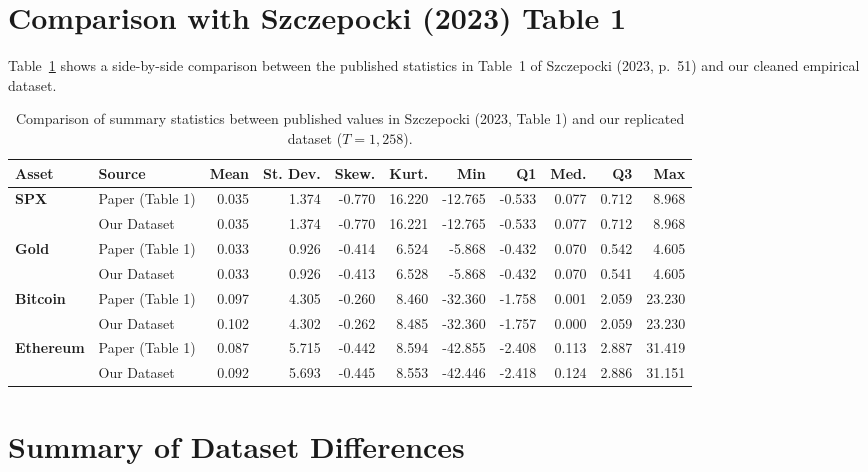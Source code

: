 \documentclass[11pt,a4paper]{article}
\begin{document}
\section{Comparison with Szczepocki (2023) Table 1}

Table~\ref{tab:comparison} shows a side-by-side comparison between the published statistics in Table~1 of Szczepocki (2023, p.~51) and our cleaned empirical dataset.

\begin{table}[htbp]
\centering
\small
\caption{Comparison of summary statistics between published values in Szczepocki (2023, Table 1) and our replicated dataset ($T = 1{,}258$).}
\label{tab:comparison}
\vspace{0.5em}
\setlength{\tabcolsep}{4.5pt}
\begin{tabular}{llrrrrrrrrr}
\toprule
\textbf{Asset} & \textbf{Source} & \textbf{Mean} & \textbf{St. Dev.} & \textbf{Skew.} & \textbf{Kurt.} & \textbf{Min} & \textbf{Q1} & \textbf{Med.} & \textbf{Q3} & \textbf{Max} \\
\midrule
\textbf{SPX}      & Paper (Table 1) & 0.035 & 1.374 & -0.770 & 16.220 & -12.765 & -0.533 & 0.077 & 0.712 &  8.968 \\
                  & Our Dataset     & 0.035 & 1.374 & -0.770 & 16.221 & -12.765 & -0.533 & 0.077 & 0.712 &  8.968 \\
\addlinespace
\textbf{Gold}     & Paper (Table 1) & 0.033 & 0.926 & -0.414 &  6.524 &  -5.868 & -0.432 & 0.070 & 0.542 &  4.605 \\
                  & Our Dataset     & 0.033 & 0.926 & -0.413 &  6.528 &  -5.868 & -0.432 & 0.070 & 0.541 &  4.605 \\
\addlinespace
\textbf{Bitcoin}  & Paper (Table 1) & 0.097 & 4.305 & -0.260 &  8.460 & -32.360 & -1.758 & 0.001 & 2.059 & 23.230 \\
                  & Our Dataset     & 0.102 & 4.302 & -0.262 &  8.485 & -32.360 & -1.757 & 0.000 & 2.059 & 23.230 \\
\addlinespace
\textbf{Ethereum} & Paper (Table 1) & 0.087 & 5.715 & -0.442 &  8.594 & -42.855 & -2.408 & 0.113 & 2.887 & 31.419 \\
                  & Our Dataset     & 0.092 & 5.693 & -0.445 &  8.553 & -42.446 & -2.418 & 0.124 & 2.886 & 31.151 \\
\bottomrule
\end{tabular}
\end{table}

\section{Summary of Dataset Differences}
\end{document}
